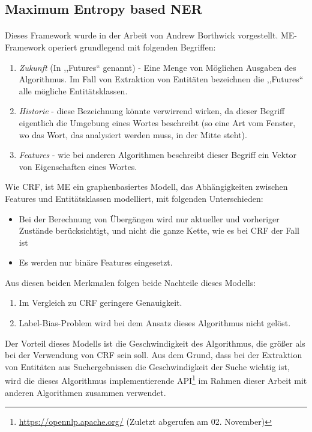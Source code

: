 \subsection{Maximum Entropy based NER} \label{sec:MEGRUND}
\paragraph{}
Dieses Framework wurde in der Arbeit von Andrew Borthwick\cite{borthwick1999maximum} vorgestellt. ME-Framework operiert grundlegend mit folgenden Begriffen:
\begin{enumerate}
\item \textit{Zukunft} (In \cite{borthwick1999maximum} ,,Futures`` genannt) - Eine Menge von Möglichen Ausgaben des Algorithmus. Im Fall von Extraktion von Entitäten bezeichnen die ,,Futures`` alle mögliche Entitätsklassen.
\item \textit{Historie} - diese Bezeichnung könnte verwirrend wirken, da dieser Begriff eigentlich die Umgebung eines Wortes beschreibt (so eine Art vom Fenster, wo das Wort, das analysiert werden muss, in der Mitte steht).
\item \textit{Features} - wie bei anderen Algorithmen beschreibt dieser Begriff ein Vektor von Eigenschaften eines Wortes.
\end{enumerate}

Wie CRF, ist ME ein graphenbasiertes Modell, das Abhängigkeiten zwischen Features und Entitätsklassen modelliert, mit folgenden Unterschieden:
\begin{itemize}
\item Bei der Berechnung von Übergängen wird nur aktueller und vorheriger Zustände berücksichtigt, und nicht die ganze Kette, wie es bei CRF der Fall ist\cite{lafferty2001conditional}\cite{rossler2007korpus}
\item Es werden nur binäre Features\cite{ratnaparkhi1998maximum}\cite{borthwick1999maximum} eingesetzt.
\end{itemize}

Aus diesen beiden Merkmalen folgen beide Nachteile dieses Modells:
\begin{enumerate}
\item Im Vergleich zu CRF\cite{rossler2007korpus} geringere Genauigkeit.
\item Label-Bias-Problem wird bei dem Ansatz dieses Algorithmus nicht gelöst\cite{lafferty2001conditional}.
\end{enumerate}
Der Vorteil dieses Modells ist die Geschwindigkeit des Algorithmus, die größer als bei der Verwendung von CRF sein soll\cite{Jenny/etal:07}. Aus dem Grund, dass bei der Extraktion von Entitäten aus Suchergebnissen die Geschwindigkeit der Suche wichtig ist, wird die dieses Algorithmus implementierende API\footnote{\url{https://opennlp.apache.org/} (Zuletzt abgerufen am 02. November)} im Rahmen dieser Arbeit mit anderen Algorithmen zusammen verwendet.

